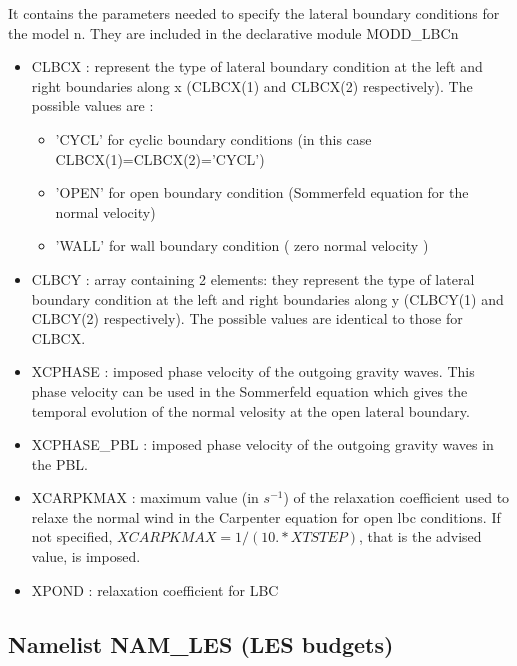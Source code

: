 It contains the parameters needed to specify the lateral boundary conditions for
the model n. They are
included in the declarative module MODD\_LBCn
\begin{itemize}
\item
{}
CLBCX : represent the type of lateral boundary
condition at the left and right boundaries along x (CLBCX(1) and CLBCX(2)
respectively). The possible values are : 
\begin{itemize}
\item 
'CYCL' for cyclic boundary  conditions (in this case CLBCX(1)=CLBCX(2)='CYCL')
\item 
'OPEN' for open boundary condition (Sommerfeld equation for the normal velocity)
\item 
'WALL' for wall boundary   condition ( zero normal velocity )
\end{itemize}
 
\item
{}
CLBCY : array containing 2 elements: they represent the type of lateral boundary
condition at the left and right boundaries along y (CLBCY(1) and CLBCY(2)
respectively). The possible values are identical to those for CLBCX. 

\item
{}
XCPHASE : imposed phase velocity of the outgoing gravity waves. This phase
velocity can be  used in the Sommerfeld equation which gives the temporal
evolution of the normal velosity at the open lateral boundary.  

\item
{}
XCPHASE\_PBL : imposed phase velocity of the outgoing gravity waves in the PBL. 

\item
{}
XCARPKMAX : maximum value (in $s^{-1}$)  of the relaxation coefficient used to
relaxe the normal wind in the Carpenter equation for open lbc conditions.
If not specified,  $XCARPKMAX=1/(10.* XTSTEP)$, that is the advised value, is imposed.

\item
{}
XPOND :  relaxation coefficient for LBC

\end{itemize}
\newpage
\subsection{Namelist NAM\_LES (LES budgets)}                                          
\label{ss:LESbudget}

